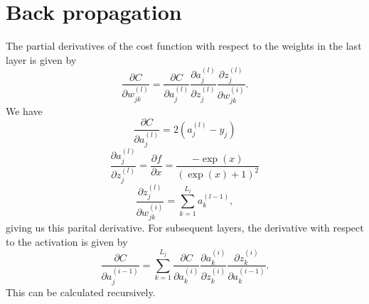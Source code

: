 \section*{Back propagation}
The partial derivatives of the cost function with respect to the weights in the last layer is given by
$$
    \frac{\partial C}{\partial w^{(l)}_{jk}} = \frac{\partial C}{\partial a^{(l)}_{j}} 
    \frac{\partial a^{(l)}_{j}}{\partial z^{(l)}_{j}} \frac{\partial z^{(l)}_{j}}{\partial w^{(i)}_{jk}}.
$$
We have
$$
    \frac{\partial C}{\partial a^{(l)}_{j}} = 2(a^{(l)}_{j} - y_j) 
$$
$$
    \frac{\partial a^{(l)}_{j}}{\partial z^{(l)}_{j}} = \frac{\partial f}{\partial x} = \frac{-\exp(x)}{(\exp(x) + 1)^2}
$$
$$
\frac{\partial z^{(l)}_{j}}{\partial w^{(i)}_{jk}} = \sum_{k = 1}^{L_l}a^{(l - 1)}_k,
$$
giving us this parital derivative. For subsequent layers, the derivative with respect to the activation is given by
$$
    \frac{\partial C}{\partial a^{(i - 1)}_{j}} = \sum_{k = 1}^{L_j}\frac{\partial C}{\partial a^{(i)}_{k}} 
    \frac{\partial a^{(i)}_{k}}{\partial z^{(i)}_{k}} \frac{\partial z^{(i)}_{k}}{\partial a^{(i -1)}_{k}}.
$$
This can be calculated recursively.